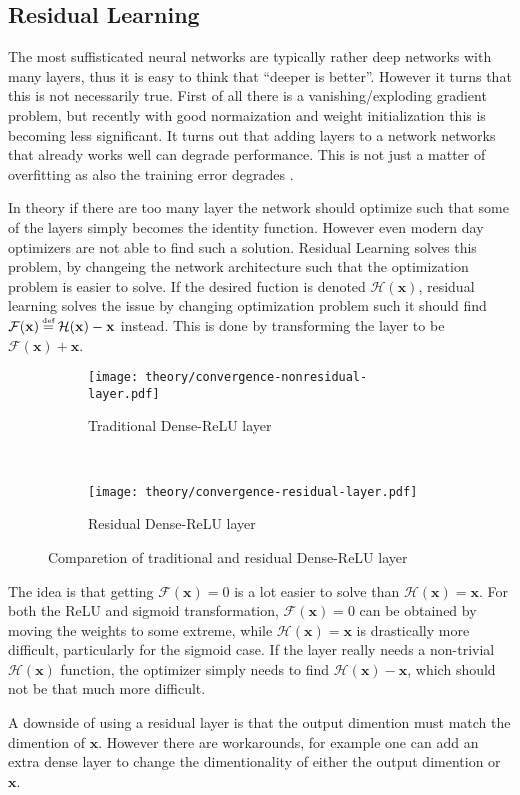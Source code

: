 \subsection{Residual Learning}

The most suffisticated neural networks are typically rather deep networks with many layers, thus it is easy to think that ``deeper is better''. However it turns that this is not necessarily true. First of all there is a vanishing/exploding gradient problem, but recently with good normaization and weight initialization this is becoming less significant. It turns out that adding layers to a network networks that already works well can degrade performance. This is not just a matter of overfitting as also the training error degrades \cite{residual-learning}.

In theory if there are too many layer the network should optimize such that some of the layers simply becomes the identity function. However even modern day optimizers are not able to find such a solution. Residual Learning solves this problem, by changeing the network architecture such that the optimization problem is easier to solve. If the desired fuction is denoted $\mathcal{H}(\mathbf{x})$, residual learning solves the issue by changing optimization problem such it should find $\mathcal{F}(\mathbf{x}) \defeq \mathcal{H}(\mathbf{x}) - \mathbf{x}$ instead. This is done by transforming the layer to be $\mathcal{F}(\mathbf{x}) + \mathbf{x}$.

\begin{figure}[H]
    \centering
    \begin{subfigure}[b]{0.4\textwidth}
        \centering
        \texttt{[image: theory/convergence-nonresidual-layer.pdf]}
        \caption{Traditional Dense-ReLU layer}
    \end{subfigure}
    ~ %
    \begin{subfigure}[b]{0.4\textwidth}
        \centering
        \texttt{[image: theory/convergence-residual-layer.pdf]}
        \caption{Residual Dense-ReLU layer}
    \end{subfigure}
    \caption{Comparetion of traditional and residual Dense-ReLU layer}
\end{figure}

The idea is that getting $\mathcal{F}(\mathbf{x}) = 0$ is a lot easier to solve than $\mathcal{H}(\mathbf{x}) = \mathbf{x}$. For both the ReLU and sigmoid transformation, $\mathcal{F}(\mathbf{x}) = 0$ can be obtained by moving the weights to some extreme, while $\mathcal{H}(\mathbf{x}) = \mathbf{x}$ is drastically more difficult, particularly for the sigmoid case. If the layer really needs a non-trivial $\mathcal{H}(\mathbf{x})$ function, the optimizer simply needs to find $\mathcal{H}(\mathbf{x}) - \mathbf{x}$, which should not be that much more difficult.

A downside of using a residual layer is that the output dimention must match the dimention of $\mathbf{x}$. However there are workarounds, for example one can add an extra dense layer to change the dimentionality of either the output dimention or $\mathbf{x}$.